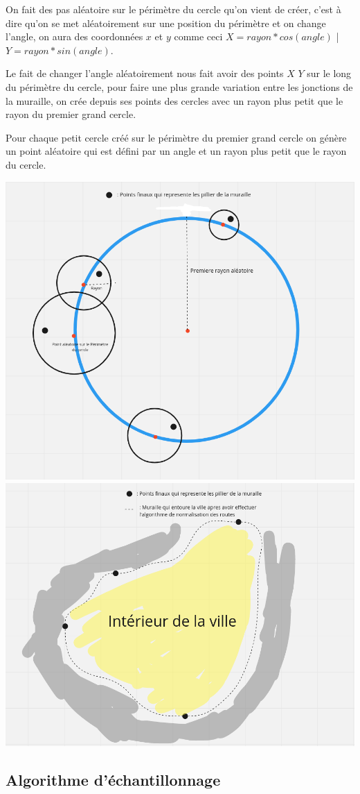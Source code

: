 On fait des pas aléatoire sur le périmètre du cercle qu'on vient de créer, c’est à dire qu’on se met aléatoirement sur une position du périmètre et on change l’angle, on aura des coordonnées $x$ et $y$ comme ceci $X =  rayon * cos(angle)$ | $Y = rayon * sin(angle)$.

Le fait de changer l’angle aléatoirement nous fait avoir des points $X$ $Y$ sur le long du périmètre du cercle, pour faire une plus grande variation entre les jonctions de la muraille, on crée depuis ses points des cercles avec un rayon plus petit que le rayon du premier grand cercle.

Pour chaque petit cercle créé sur le périmètre du premier grand cercle on génère un point aléatoire qui est défini par un angle et un rayon plus petit que le rayon du cercle.

\begin{center}
  \includegraphics[height = 6 cm]{images/algorithme.png}
  \includegraphics[height = 6 cm]{images/algo_final.png}\\
\end{center}

\subsection{Algorithme d'échantillonnage}

